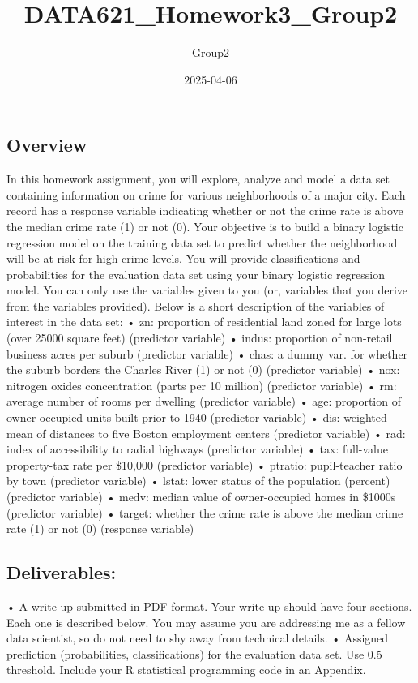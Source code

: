 \documentclass[
]{article}
\title{DATA621\_Homework3\_Group2}
\author{Group2}
\date{2025-04-06}
\begin{document}
\maketitle

{
\setcounter{tocdepth}{5}
\tableofcontents
}
\subsection{Overview}\label{overview}

In this homework assignment, you will explore, analyze and model a data
set containing information on crime for various neighborhoods of a major
city. Each record has a response variable indicating whether or not the
crime rate is above the median crime rate (1) or not (0). Your objective
is to build a binary logistic regression model on the training data set
to predict whether the neighborhood will be at risk for high crime
levels. You will provide classifications and probabilities for the
evaluation data set using your binary logistic regression model. You can
only use the variables given to you (or, variables that you derive from
the variables provided). Below is a short description of the variables
of interest in the data set: • zn: proportion of residential land zoned
for large lots (over 25000 square feet) (predictor variable) • indus:
proportion of non-retail business acres per suburb (predictor variable)
• chas: a dummy var. for whether the suburb borders the Charles River
(1) or not (0) (predictor variable) • nox: nitrogen oxides concentration
(parts per 10 million) (predictor variable) • rm: average number of
rooms per dwelling (predictor variable) • age: proportion of
owner-occupied units built prior to 1940 (predictor variable) • dis:
weighted mean of distances to five Boston employment centers (predictor
variable) • rad: index of accessibility to radial highways (predictor
variable) • tax: full-value property-tax rate per \$10,000 (predictor
variable) • ptratio: pupil-teacher ratio by town (predictor variable) •
lstat: lower status of the population (percent) (predictor variable) •
medv: median value of owner-occupied homes in \$1000s (predictor
variable) • target: whether the crime rate is above the median crime
rate (1) or not (0) (response variable)

\subsection{Deliverables:}\label{deliverables}

• A write-up submitted in PDF format. Your write-up should have four
sections. Each one is described below. You may assume you are addressing
me as a fellow data scientist, so do not need to shy away from technical
details. • Assigned prediction (probabilities, classifications) for the
evaluation data set. Use 0.5 threshold. Include your R statistical
programming code in an Appendix.
\end{document}
